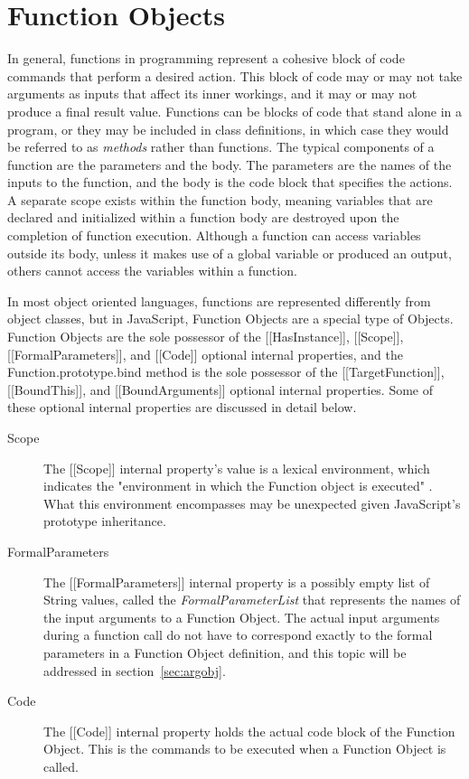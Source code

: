 \documentclass[a4paper,11pt,twoside]{report}
\begin{document}
\section{Function Objects}
In general, functions in programming represent a cohesive block of code commands that perform a desired action. This block of code may or may not take arguments as inputs that affect its inner workings, and it may or may not produce a final result value. Functions can be blocks of code that stand alone in a program, or they may be included in class definitions, in which case they would be referred to as \textit{methods} rather than functions. The typical components of a function are the parameters and the body. The parameters are the names of the inputs to the function, and the body is the code block that specifies the actions. A separate scope exists within the function body, meaning variables that are declared and initialized within a function body are destroyed upon the completion of function execution. Although a function can access variables outside its body, unless it makes use of a global variable or produced an output, others cannot access the variables within a function.

In most object oriented languages, functions are represented differently from object classes, but in JavaScript, Function Objects are a special type of Objects. Function Objects are the sole possessor of the  [[HasInstance]], [[Scope]], [[FormalParameters]], and [[Code]] optional internal properties, and the Function.prototype.bind method is the sole possessor of the [[TargetFunction]], [[BoundThis]], and [[BoundArguments]] optional internal properties. Some of these optional internal properties are discussed in detail below.

\begin{description}
\item[Scope] The [[Scope]] internal property's value is a lexical environment, which indicates the "environment in which the Function object is executed" \cite{EcmaScript}. What this environment encompasses may be unexpected given JavaScript's prototype inheritance.

\item[FormalParameters] The [[FormalParameters]] internal property is a possibly empty list of String values, called the \textit{FormalParameterList} that represents the names of the input arguments to a Function Object. The actual input arguments during a function call do not have to correspond exactly to the formal parameters in a Function Object definition, and this topic will be addressed in section~\ref{sec:argobj}.

\item[Code] The [[Code]] internal property holds the actual code block of the Function Object. This is the commands to be executed when a Function Object is called.
\end{description}
\end{document}
